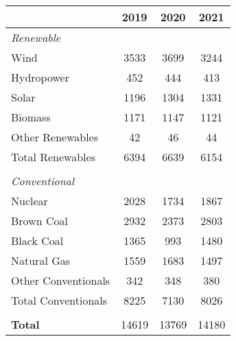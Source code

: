 \documentclass{article}%
\begin{document}
%
\normalsize%
\setlength{\tabcolsep}{12pt}%
\begin{tabular}{@{}l c c c@{}}%
\toprule%
&\textbf{2019}&\textbf{2020}&\textbf{2021}\\%
\midrule%
\textit{Renewable}&&&\\%
Wind&3533&3699&3244\\%
Hydropower&452&444&413\\%
Solar&1196&1304&1331\\%
Biomass&1171&1147&1121\\%
Other Renewables&42&46&44\\%
\midrule%
Total Renewables&6394&6639&6154\\%
&&&\\%
\textit{Conventional}&&&\\%
Nuclear&2028&1734&1867\\%
Brown Coal&2932&2373&2803\\%
Black Coal&1365&993&1480\\%
Natural Gas&1559&1683&1497\\%
Other Conventionals&342&348&380\\%
\midrule%
Total Conventionals&8225&7130&8026\\%
&&&\\%
\midrule%
\textbf{Total}&14619&13769&14180\\\bottomrule%
%
\end{tabular}%
\end{document}
